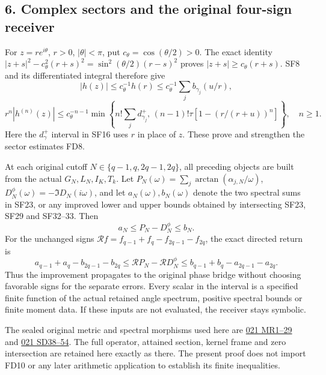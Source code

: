 \documentclass[10pt]{article}
\begin{document}
\subsection{6. Complex sectors and the original four-sign receiver}\label{complex-sectors-and-the-original-four-sign-receiver}

For \(z=re^{i\theta}\), \(r>0\), \(|\theta|<\pi\), put \(c_\theta=\cos(\theta/2)>0\). The exact identity \(|z+s|^2-c_\theta^2(r+s)^2
=\sin^2(\theta/2)(r-s)^2\) proves \(|z+s|\ge c_\theta(r+s)\). SF8 and its differentiated integral therefore give \[
 |h(z)|\le c_\theta^{-1}h(r)
 \le c_\theta^{-1}\sum_j b_{\gamma_j}(u/r),
\] \[
 r^n|h^{(n)}(z)|
 \le c_\theta^{-n-1}
 \min\!\left\{
 n!\sum_j d_{\gamma_j}^+,\,
 (n-1)!\tau[1-(r/(r+u))^n]\right\},\quad n\ge1 .
 \tag{SF35}
\] Here the \(d_\gamma^+\) interval in SF16 uses \(r\) in place of \(z\). These prove and strengthen the sector estimates FD8.

At each original cutoff \(N\in\{q-1,q,2q-1,2q\}\), all preceding objects are built from the actual \(G_N,L_N,I_K,T_k\). Let \(P_N(\omega)=\sum_j\arctan(\alpha_{j,N}/\omega)\), \(D_N^\phi(\omega)=-\Im D_N(i\omega)\), and let \(a_N(\omega),b_N(\omega)\) denote the two spectral sums in SF23, or any improved lower and upper bounds obtained by intersecting SF23, SF29 and SF32--33. Then \[
 a_N\le P_N-D_N^\phi\le b_N .
\] For the unchanged signs \(\mathcal R f=f_{q-1}+f_q-f_{2q-1}-f_{2q}\), the exact directed return is \[
 a_{q-1}+a_q-b_{2q-1}-b_{2q}
 \le \mathcal RP_N-\mathcal RD_N^\phi
 \le b_{q-1}+b_q-a_{2q-1}-a_{2q}.
 \tag{SF36}
\] Thus the improvement propagates to the original phase bridge without choosing favorable signs for the separate errors. Every scalar in the interval is a specified finite function of the actual retained angle spectrum, positive spectral bounds or finite moment data. If these inputs are not evaluated, the receiver stays symbolic.

The sealed original metric and spectral morphisms used here are \href{https://github.com/KokunoYumeto/zeta-function-research-reader/blob/e40b46fde72c245dd79ef5691f59c21d6cbf0c75/workbenches/splitzero-tandem/continuations/20260922-original-observation-recovery/MATRIX_RECOVERY_PROOFS.md\#L7}{021 MR1--29} and \href{https://github.com/KokunoYumeto/zeta-function-research-reader/blob/e40b46fde72c245dd79ef5691f59c21d6cbf0c75/workbenches/splitzero-tandem/continuations/20260922-original-observation-recovery/SCALAR_RECOVERY_PROOFS.md\#L385}{021 SD38--54}. The full operator, attained section, kernel frame and zero intersection are retained here exactly as there. The present proof does not import FD10 or any later arithmetic application to establish its finite inequalities.
\end{document}
